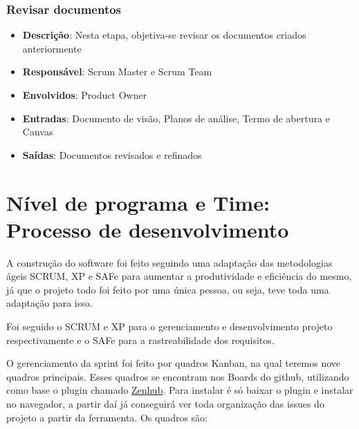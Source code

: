 \subsubsection{Revisar documentos}

\begin{itemize}
  \item \textbf{Descrição}: Nesta etapa, objetiva-se revisar os documentos criados anteriormente
  \item \textbf{Responsável}: Scrum Master e Scrum Team
  \item \textbf{Envolvidos}: Product Owner
  \item \textbf{Entradas}: Documento de visão, Planos de análise, Termo de abertura e Canvas
  \item \textbf{Saídas}: Documentos revisados e refinados
\end{itemize}

\section{Nível de programa e Time: Processo de desenvolvimento}

A construção do software foi feito seguindo uma adaptação das metodologias ágeis SCRUM, XP e SAFe para aumentar a produtividade e eficiência do mesmo, já que o projeto todo foi feito por uma única pessoa, ou seja, teve toda uma adaptação para isso.

Foi seguido o SCRUM e XP para o gerenciamento e desenvolvimento projeto respectivamente e o SAFe para a rastreabilidade dos requisitos.

O gerenciamento da sprint foi feito por quadros Kanban, na qual teremos nove quadros principais. Esses quadros se encontram nos Boards do github, utilizando como base o plugin chamado \href{https://www.zenhub.com/}{Zenhub}. Para instalar é só baixar o plugin e instalar no navegador, a partir daí já conseguirá ver toda organização das issues do projeto a partir da ferramenta. Os quadros são:

